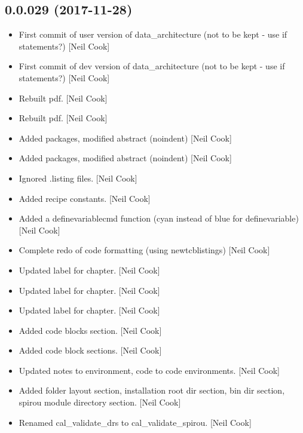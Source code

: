 \documentclass[a4paper,10pt,english]{report}
\begin{document}
\subsection{0.0.029 (2017-11-28)}
\label{\detokenize{misc/changelog:id521}}\begin{itemize}
\item {} 
First commit of user version of data\_architecture (not to be kept -
use if statements?) {[}Neil Cook{]}

\item {} 
First commit of dev version of data\_architecture (not to be kept - use
if statements?) {[}Neil Cook{]}

\item {} 
Rebuilt pdf. {[}Neil Cook{]}

\item {} 
Rebuilt pdf. {[}Neil Cook{]}

\item {} 
Added packages, modified abstract (noindent) {[}Neil Cook{]}

\item {} 
Added packages, modified abstract (noindent) {[}Neil Cook{]}

\item {} 
Ignored .listing files. {[}Neil Cook{]}

\item {} 
Added recipe constants. {[}Neil Cook{]}

\item {} 
Added a definevariablecmd function (cyan instead of blue for
definevariable) {[}Neil Cook{]}

\item {} 
Complete redo of code formatting (using newtcblistings) {[}Neil Cook{]}

\item {} 
Updated label for chapter. {[}Neil Cook{]}

\item {} 
Updated label for chapter. {[}Neil Cook{]}

\item {} 
Updated label for chapter. {[}Neil Cook{]}

\item {} 
Added code blocks section. {[}Neil Cook{]}

\item {} 
Added code block sections. {[}Neil Cook{]}

\item {} 
Updated notes to environment, code to code environments. {[}Neil Cook{]}

\item {} 
Added folder layout section, installation root dir section, bin dir
section, spirou module directory section. {[}Neil Cook{]}

\item {} 
Renamed cal\_validate\_drs to cal\_validate\_spirou. {[}Neil Cook{]}

\end{itemize}
\end{document}
